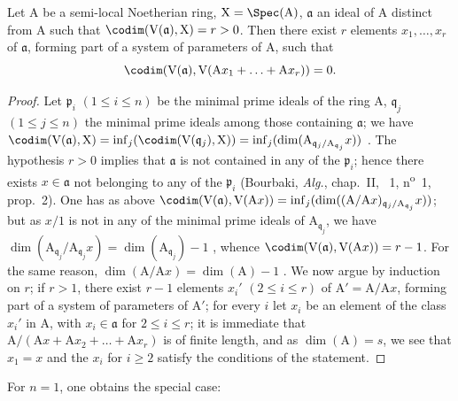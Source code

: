 \begin{proposition}[16.3.1]
\label{0.16.3.1}
Let $\mathrm{A}$ be a semi-local Noetherian ring, $\mathrm{X}=\Spec(\mathrm{A})$, $\mathfrak{a}$ an ideal of $\mathrm{A}$ distinct from $\mathrm{A}$ such that $\codim(\mathrm{V}(\mathfrak{a}),\mathrm{X})=r>0$.
Then there exist $r$ elements $x_1,\ldots,x_r$ of $\mathfrak{a}$, forming part of a system of parameters of $\mathrm{A}$, such that
\[
  \codim(\mathrm{V}(\mathfrak{a}),\mathrm{V}(\mathrm{A}x_1+\ldots+\mathrm{A}x_r))=0.
\]
\end{proposition}

\begin{proof}
Let $\mathfrak{p}_i$ $(1\leq i\leq n)$ be the minimal prime ideals of the ring $\mathrm{A}$, $\mathfrak{q}_j$ $(1\leq j\leq n)$ the minimal prime ideals among those containing $\mathfrak{a}$; we have  $\codim(\mathrm{V}(\mathfrak{a}),\mathrm{X})=\inf_j(\codim(\mathrm{V}(\mathfrak{q}_j),\mathrm{X}))=\inf_j(\dim(\mathrm{A}_{\mathfrak{q}_j/\mathrm{A}_{\mathfrak{q}_j}}x))$ .
The hypothesis $r>0$ implies that $\mathfrak{a}$ is not contained in any of the $\mathfrak{p}_i$; hence there exists $x\in\mathfrak{a}$ not belonging to any of the $\mathfrak{p}_i$ (Bourbaki, \emph{Alg.}, chap.~II, \textsection~1, n\textsuperscript{o}~1, prop.~2).
One has as above $\codim(\mathrm{V}(\mathfrak{a}),\mathrm{V}(\mathrm{A}x))=\inf_j(\dim((\mathrm{A}/\mathrm{A}x)_{\mathfrak{q}_j/\mathrm{A}_{\mathfrak{q}_j}}x))$; but as $x/1$ is not in any of the minimal prime ideals of $\mathrm{A}_{\mathfrak{q}_j}$, we have $\dim(\mathrm{A}_{\mathfrak{q}_j}/\mathrm{A}_{\mathfrak{q}_j}x)=\dim(\mathrm{A}_{\mathfrak{q}_j})-1$ , whence $\codim(\mathrm{V}(\mathfrak{a}),\mathrm{V}(\mathrm{A}x))=r-1$.
For the same reason, $\dim(\mathrm{A}/\mathrm{A}x)=\dim(\mathrm{A})-1$ .
We now argue by induction on $r$; if $r>1$, there exist $r-1$ elements $x_i'$ $(2\leq i\leq r)$ of $\mathrm{A}'=\mathrm{A}/\mathrm{A}x$, forming part of a system of parameters of $\mathrm{A}'$; for every $i$ let $x_i$ be an element of the class $x_i'$ in $\mathrm{A}$, with $x_i\in\mathfrak{a}$ for $2\leq i\leq r$; it is immediate that $\mathrm{A}/(\mathrm{A}x+\mathrm{A}x_2+\ldots+\mathrm{A}x_r)$ is of finite length, and as $\dim(\mathrm{A})=s$, we see that $x_1=x$ and the $x_i$ for $i\geq 2$ satisfy the conditions of the statement.
\end{proof}

For $n=1$, one obtains the special case:


